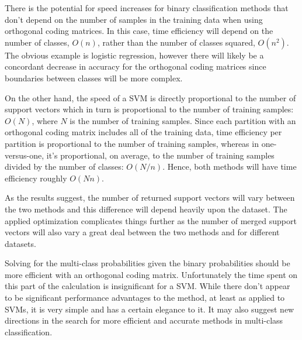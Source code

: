 There is the potential for speed increases for binary classification methods
that don't depend on the number of samples in the training data when using
orthogonal coding matrices.
In this case, time efficiency will depend on the number of classes,
$O(n)$, rather than the number of classes squared, $O(n^2)$.
The obvious example is logistic regression, however there will likely be
a concordant decrease in accuracy for the orthogonal coding matrices since
boundaries between classes will be more complex.

On the other hand, the speed of a SVM is directly proportional to the number 
of support vectors which in turn is proportional to the number of training samples: 
$O(N)$, where $N$ is the number of training samples.
Since each partition with an orthogonal coding matrix includes all of the
training data, time efficiency per partition is proportional to the number
of training samples, whereas in one-versus-one, it's proportional, on average,
to the number of training samples divided by the number of classes: $O(N/n)$.
Hence, both methods will have time efficiency roughly $O(Nn)$.

As the results suggest, the number of returned support vectors will vary 
between the two methods and this difference will depend heavily upon the 
dataset.
The applied optimization complicates things further as the number of merged
support vectors will also vary a great deal between the two methods and
for different datasets.

Solving for the multi-class probabilities given the binary probabilities should
be more efficient with an orthogonal coding matrix. 
Unfortunately the time
spent on this part of the calculation is insignificant for a SVM.
While there don't appear to be significant performance advantages to the method,
at least as applied to SVMs, 
it is very simple and has a certain elegance to it.
It may also suggest new directions in the search for more efficient and
accurate methods in multi-class classification.


